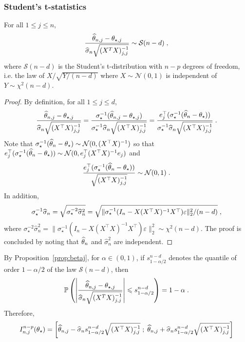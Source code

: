 \subsubsection*{Student's t-statistics}
\begin{shaded}
\begin{proposition}
\label{prop:betaj}
For all $1\leqslant j \leqslant n$,
\[
\frac{\widehat {\theta}_{n,j} -\theta_{\star,j}}{\widehat\sigma_{n}\sqrt{(X^TX)_{j,j}^{-1}}} \sim \mathcal{S}(n-d)\;,
\]
where $\mathcal{S}(n-d)$ is the Student's t-distribution with $n-p$ degrees of freedom, i.e. the law of $X/\sqrt{Y/(n-d)}$ where $X\sim\mathcal{N}(0,1)$ is independent of $Y\sim\chi^2(n-d)$.
\end{proposition}
\end{shaded}
\begin{proof}
By definition, for all $1\leqslant j \leqslant d$,  
\[
\frac{\widehat {\theta}_{n,j} -\theta_{\star,j}}{\widehat\sigma_{n}\sqrt{(X^\top X)_{j,j}^{-1}}} = \frac{\sigma_\star^{-1}(\widehat {\theta}_{n,j} -\theta_{\star,j})}{\sigma_\star^{-1}\widehat\sigma_{n}\sqrt{(X^\top X)_{j,j}^{-1}}} = \frac{e^\top_j(\sigma_\star^{-1}(\widehat {\theta}_{n} -\theta_{\star}))}{\sigma_\star^{-1}\widehat\sigma_{n}\sqrt{(X^\top X)_{j,j}^{-1}}}\;.
\]
Note that $\sigma_\star^{-1}(\widehat {\theta}_{n} -\theta_{\star}) \sim \mathcal{N}(0,(X^\top X)^{-1})$ so that $e^\top_j(\sigma_\star^{-1}(\widehat {\theta}_{n} -\theta_{\star}))\sim \mathcal{N}(0,e^\top_j(X^\top X)^{-1}e_j)$ and 
\[
\frac{e^\top_j(\sigma_\star^{-1}(\widehat {\theta}_{n} -\theta_{\star}))}{\sqrt{(X^\top X)_{j,j}^{-1}}}\sim\mathcal{N}(0,1)\;.
\]
In addition,
\[
\sigma_\star^{-1}\widehat\sigma_{n} = \sqrt{\sigma_\star^{-2}\widehat\sigma^2_{n}} = \sqrt{\|\sigma_\star^{-1}(I_n - X(X^\top X)^{-1}X^\top)\varepsilon\|_2^2/(n-d)}\;,
\]
where $\sigma_\star^{-2}\widehat\sigma^2_{n} = \|\sigma_\star^{-1}(I_n - X(X^\top X)^{-1}X^\top)\varepsilon\|_2^2 \sim \chi^2(n-d)$. The proof is concluded by noting that $\widehat {\theta}_n$ and  $\widehat\sigma^2_{n}$ are independent.
\end{proof}
By Proposition~\ref{prop:betaj}, for $\alpha\in(0,1)$, if $s_{1-\alpha/2}^{n-d}$ denotes the quantile of order $1-\alpha/2$ of the law $\mathcal{S}(n-d)$, then 
\[
\mathbb{P}\left(\left|\frac{\widehat {\theta}_{n,j} -\theta_{\star,j}}{\widehat\sigma_{n}\sqrt{(X^TX)_{j,j}^{-1}}}\right| \leqslant s_{1-\alpha/2}^{n-d}\right) = 1-\alpha\;.
\]
Therefore, 
\[
I^{n-p}_{n,j}(\theta_{\star}) = \left[\widehat {\theta}_{n,j} -\widehat\sigma_{n}s_{1-\alpha/2}^{n-d}\sqrt{(X^\top X)_{j,j}^{-1}}\;;\; \widehat {\theta}_{n,j} + \widehat\sigma_{n}s_{1-\alpha/2}^{n-d}\sqrt{(X^\top X)_{j,j}^{-1}}\right]
\]
